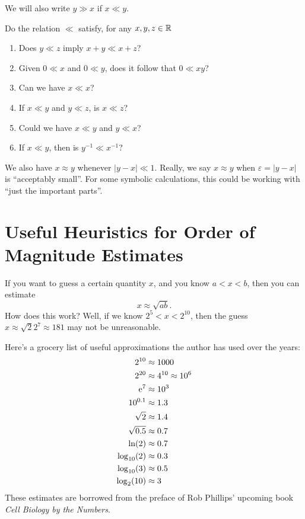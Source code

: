 We will also write $y\gg x$ if $x\ll y$.

 Do the relation $\ll$ satisfy, for any $x,y,z\in\mathbb{R}$
\begin{enumerate}
\item Does $y\ll z$ imply $x+y\ll x+z$?
\item Given $0\ll x$ and $0\ll y$, does it follow that $0\ll xy$?
\item Can we have $x\ll x$?
\item If $x\ll y$ and $y\ll z$, is $x\ll z$?
\item Could we have $x\ll y$ and $y\ll x$?
\item If $x\ll y$, then is $y^{-1}\ll x^{-1}$?
\end{enumerate}

We also have $x\approx y$ whenever $|y-x|\ll1$.
Really, we say $x\approx y$ when $\varepsilon=|y-x|$ is ``acceptably
small''. For some symbolic calculations, this could be working with
``just the important parts''.

\section{Useful Heuristics for Order of Magnitude Estimates}

If you want to guess a certain quantity $x$, and you know $a<x<b$, then
you can estimate
\begin{equation}
x\approx\sqrt{ab}.
\end{equation}
How does this work? Well, if we know $2^{5}<x<2^{10}$, then the guess
$x\approx \sqrt{2}2^{7}\approx 181$ may not be unreasonable.

Here's a grocery list of useful approximations the author has used over
the years:
\begin{align}
2^{10} &\approx 1000\\
2^{20} &\approx 4^{10}\approx 10^{6}\\
\mathrm{e}^{7} &\approx 10^{3}\\
10^{0.1} &\approx 1.3\\
\sqrt{2} &\approx 1.4\\
\sqrt{0.5} & \approx 0.7\\
\ln(2) &\approx 0.7\\
\log_{10}(2) &\approx 0.3\\
\log_{10}(3) &\approx 0.5\\
\log_{2}(10) &\approx 3
\end{align}
These estimates are borrowed from the preface of Rob Phillips' upcoming
book \emph{Cell Biology by the Numbers}.

